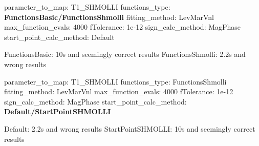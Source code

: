 parameter\-\_\-to\-\_\-map\-: T1\-\_\-\-S\-H\-M\-O\-L\-L\-I functions\-\_\-type\-: {\bfseries Functions\-Basic/\-Functions\-Shmolli} fitting\-\_\-method\-: Lev\-Mar\-Vnl max\-\_\-function\-\_\-evals\-: 4000 f\-Tolerance\-: 1e-\/12 sign\-\_\-calc\-\_\-method\-: Mag\-Phase start\-\_\-point\-\_\-calc\-\_\-method\-: Default

Functions\-Basic\-: 10s and seemingly correct results Functions\-Shmolli\-: 2.\-2s and wrong results

parameter\-\_\-to\-\_\-map\-: T1\-\_\-\-S\-H\-M\-O\-L\-L\-I functions\-\_\-type\-: Functions\-Shmolli fitting\-\_\-method\-: Lev\-Mar\-Vnl max\-\_\-function\-\_\-evals\-: 4000 f\-Tolerance\-: 1e-\/12 sign\-\_\-calc\-\_\-method\-: Mag\-Phase start\-\_\-point\-\_\-calc\-\_\-method\-: {\bfseries Default/\-Start\-Point\-S\-H\-M\-O\-L\-L\-I}

Default\-: 2.\-2s and wrong results Start\-Point\-S\-H\-M\-O\-L\-L\-I\-: 10s and seemingly correct results 